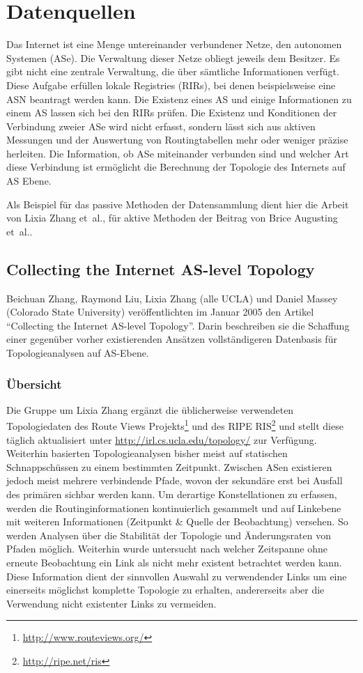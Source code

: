 \section{Datenquellen}\label{sec:datenquellen}

Das Internet ist eine Menge untereinander verbundener Netze, den autonomen Systemen (ASe).
Die Verwaltung dieser Netze obliegt jeweils dem Besitzer. Es gibt nicht eine zentrale Verwaltung, die über sämtliche Informationen verfügt.
Diese Aufgabe erfüllen lokale Registries (RIRs), bei denen beispielsweise eine ASN beantragt werden kann.
Die Existenz eines AS und einige Informationen zu einem AS lassen sich bei den RIRs prüfen.
Die Existenz und Konditionen der Verbindung zweier ASe wird nicht erfasst, sondern lässt sich aus aktiven Messungen und der Auswertung von Routingtabellen mehr oder weniger präzise herleiten.
Die Information, ob ASe miteinander verbunden sind und welcher Art diese Verbindung ist ermöglicht die Berechnung der Topologie des Internets auf AS Ebene.

Als Beispiel für das passive Methoden der Datensammlung dient hier die Arbeit von Lixia Zhang et\ al., für aktive Methoden der Beitrag von Brice Augusting et\ al..

\subsection{Collecting the Internet AS-level Topology~\cite{Zhang:2005:CIA:1052812.1052825}}

Beichuan Zhang, Raymond Liu, Lixia Zhang (alle UCLA) und Daniel Massey (Colorado State University) veröffentlichten im Januar 2005 den Artikel "`Collecting the Internet AS-level Topology"'.
Darin beschreiben sie die Schaffung einer gegenüber vorher existierenden Ansätzen vollständigeren Datenbasis für Topologieanalysen auf AS-Ebene.

\subsubsection{Übersicht}
Die Gruppe um Lixia Zhang ergänzt die üblicherweise verwendeten Topologiedaten des Route Views Projekts\footnote{\url{http://www.routeviews.org/}} und des RIPE RIS\footnote{\url{http://ripe.net/ris}} und stellt diese täglich aktualisiert unter \url{http://irl.cs.ucla.edu/topology/} zur Verfügung.
Weiterhin basierten Topologieanalysen bisher meist auf statischen Schnappschüssen zu einem bestimmten Zeitpunkt.
Zwischen ASen existieren jedoch meist mehrere verbindende Pfade, wovon der sekundäre erst bei Ausfall des primären sichbar werden kann.
Um derartige Konstellationen zu erfassen, werden die Routinginformationen kontinuierlich gesammelt und auf Linkebene mit weiteren Informationen (Zeitpunkt \& Quelle der Beobachtung) versehen.
So werden Analysen über die Stabilität der Topologie und Änderungsraten von Pfaden möglich.
Weiterhin wurde untersucht nach welcher Zeitspanne ohne erneute Beobachtung ein Link als nicht mehr existent betrachtet werden kann.
Diese Information dient der sinnvollen Auswahl zu verwendender Links um eine einerseits möglichst komplette Topologie zu erhalten, andererseits aber die Verwendung nicht existenter Links zu vermeiden.


